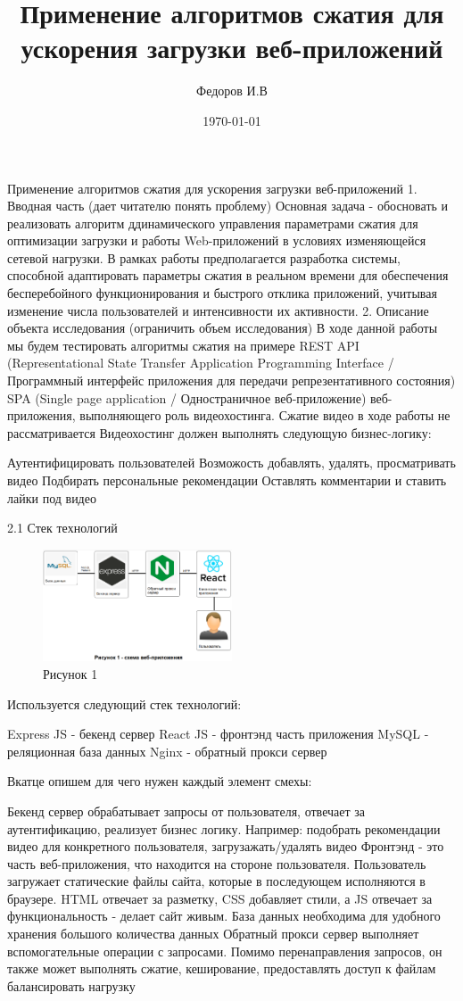 \documentclass[12pt]{article}
\title{Применение алгоритмов сжатия для ускорения загрузки веб-приложений}
\author{Федоров И.В }
\date{\today}
\begin{document}
\maketitle

Применение алгоритмов сжатия для ускорения загрузки веб-приложений
1. Вводная часть (дает читателю понять проблему)
Основная задача - обосновать и реализовать алгоритм ддинамического управления параметрами сжатия для оптимизации загрузки и работы Web-приложений в условиях изменяющейся сетевой нагрузки. В рамках работы предполагается разработка системы, способной адаптировать параметры сжатия в реальном времени для обеспечения бесперебойного функционирования и быстрого отклика приложений, учитывая изменение числа пользователей и интенсивности их активности.
2. Описание объекта исследования (ограничить объем исследования)
В ходе данной работы мы будем тестировать алгоритмы сжатия на примере REST API (Representational State Transfer Application Programming Interface / Программный интерфейс приложения для передачи репрезентативного состояния) SPA (Single page application / Одностраничное веб-приложение) веб-приложения, выполняющего роль видеохостинга. Сжатие видео в ходе работы не рассматривается
Видеохостинг должен выполнять следующую бизнес-логику:

Аутентифицировать пользователей
Возможость добавлять, удалять, просматривать видео
Подбирать персональные рекомендации
Оставлять комментарии и ставить лайки под видео

2.1 Стек технологий
\begin{figure}[h!]
\centering
\includegraphics[width=0.5\textwidth]{../images/Схема_веб-приложения.png}
\caption{Рисунок 1}
\end{figure}

Используется следующий стек технологий:

Express JS - бекенд сервер
React JS - фронтэнд часть приложения
MySQL - реляционная база данных
Nginx - обратный прокси сервер

Вкатце опишем для чего нужен каждый элемент смехы:

Бекенд сервер обрабатывает запросы от пользователя, отвечает за аутентификацию, реализует бизнес логику. Например: подобрать рекомендации видео для конкретного пользователя, загрузажать/удалять видео
Фронтэнд - это часть веб-приложения, что находится на стороне пользователя. Пользователь загружает статические файлы сайта,
которые в последующем исполняются в браузере. HTML отвечает за разметку, CSS добавляет стили, а JS отвечает за функциональность - делает сайт живым.
База данных необходима для удобного хранения большого количества данных
Обратный прокси сервер выполняет вспомогательные операции с запросами. Помимо перенаправления запросов, он также может выполнять сжатие, кеширование, предоставлять доступ к файлам
балансировать нагрузку
\end{document}
